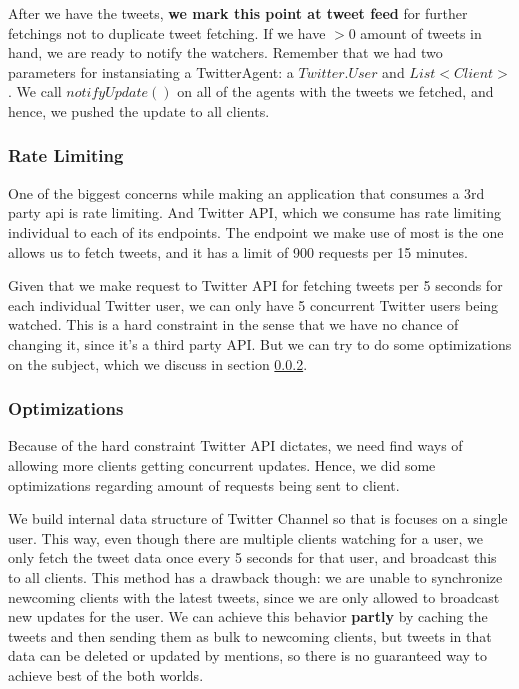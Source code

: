 \documentclass{article}
\begin{document}
\par After we have the tweets, \textbf{we mark this point at tweet feed} for further fetchings not to duplicate tweet fetching. If we have $>0$ amount of tweets in hand, we are ready to notify the watchers. Remember that we had two parameters for instansiating a TwitterAgent: a $Twitter.User$ and $List<Client>$. We call $notifyUpdate()$ on all of the agents with the tweets we fetched, and hence, we pushed the update to all clients.

\newpage

\subsubsection{Rate Limiting}
\label{rate_limiting}
One of the biggest concerns while making an application that consumes a 3rd party api is rate limiting. And Twitter API, which we consume has rate limiting individual to each of its endpoints. The endpoint we make use of most is the one allows us to fetch tweets, and it has a limit of 900 requests per 15 minutes.

\par Given that we make request to Twitter API for fetching tweets per 5 seconds for each individual Twitter user, we can only have 5 concurrent Twitter users being watched. This is a hard constraint in the sense that we have no chance of changing it, since it's a third party API. But we can try to do some optimizations on the subject, which we discuss in section \ref{optimizations}.

\subsubsection{Optimizations}
\label{optimizations}
\par Because of the hard constraint Twitter API dictates, we need find ways of allowing more clients getting concurrent updates. Hence, we did some optimizations regarding amount of requests being sent to client.

\par We build internal data structure of Twitter Channel so that is focuses on a single user. This way, even though there are multiple clients watching for a user, we only fetch the tweet data once every 5 seconds for that user, and broadcast this to all clients. This method has a drawback though: we are unable to synchronize newcoming clients with the latest tweets, since we are only allowed to broadcast new updates for the user. We can achieve this behavior \textbf{partly} by caching the tweets and then sending them as bulk to newcoming clients, but tweets in that data can be deleted or updated by mentions, so there is no guaranteed way to achieve best of the both worlds.
\end{document}
